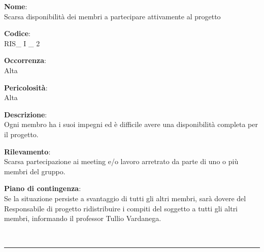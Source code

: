 {\setlength{\parindent}{0cm}
\begin{minipage}{\textwidth} 
\begin{multicols}{4}
\textbf{Nome}: \\ Scarsa disponibilità dei membri a partecipare attivamente al progetto \columnbreak

\textbf{Codice}: \\ RIS\_ I \_ 2 
\columnbreak

\textbf{Occorrenza}: \\ Alta 
\columnbreak

\textbf{Pericolosità}: \\ Alta

\end{multicols}

\begin{multicols}{3}

\textbf{Descrizione}: \\ Ogni membro ha i suoi impegni ed è difficile avere una disponibilità completa per il progetto.
\columnbreak

\textbf{Rilevamento}: \\ Scarsa partecipazione ai meeting e/o lavoro arretrato da parte di uno o più membri del gruppo.
\columnbreak

\textbf{Piano di contingenza}: \\ Se la situazione persiste a svantaggio di tutti gli altri membri, sarà dovere del Responsabile di progetto ridistribuire i compiti del soggetto a tutti gli altri membri, informando il professor Tullio Vardanega.\\

\columnbreak
\end{multicols}
\end{minipage}} \\

\noindent\rule{\textwidth}{1pt}\\


